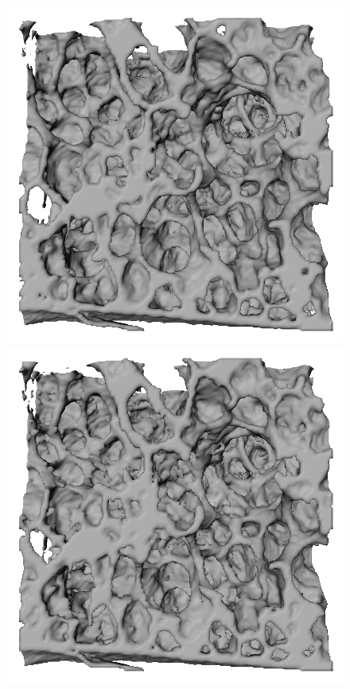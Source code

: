 \begin{figure}[htp]
		\\%
		\includegraphics[width=\imagewidth]{img/comparisonBvsT/roiB}%
		\includegraphics[width=\imagewidth]{img/comparisonBvsT/roiL}%

\end{figure}

